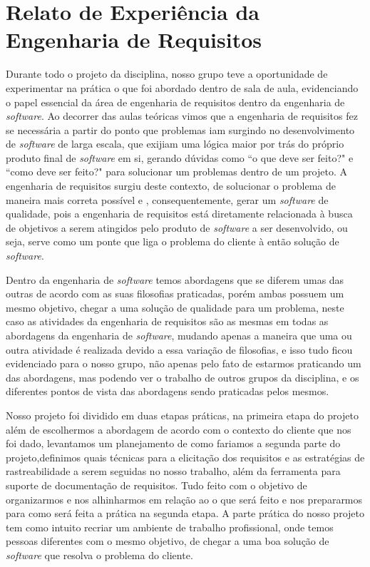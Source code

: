 \chapter{Relato de Experiência da Engenharia de Requisitos}

Durante todo o projeto da disciplina, nosso grupo teve a oportunidade de experimentar na prática o que foi abordado dentro de sala de aula, evidenciando o papel essencial da área de engenharia de requisitos dentro da engenharia de \textit{software}. Ao decorrer das aulas teóricas vimos que a engenharia de requisitos fez se necessária a partir do ponto que problemas iam surgindo no desenvolvimento de \textit{software} de larga escala, que exijiam uma lógica maior por trás do próprio produto final de \textit{software} em si, gerando dúvidas como ``o que deve ser feito?" e ``como deve ser feito?" para solucionar um problemas dentro de um projeto. A engenharia de requisitos surgiu deste contexto, de solucionar o problema de maneira mais correta possível e , consequentemente, gerar um \textit{software} de qualidade, pois a engenharia de requisitos está diretamente relacionada à busca de objetivos a serem atingidos pelo produto de \textit{software} a ser desenvolvido, ou seja, serve como um ponte que liga o problema do cliente à então solução de \textit{software}.

Dentro da engenharia de \textit{software} temos abordagens que se diferem umas das outras de acordo com as suas filosofias praticadas, porém ambas possuem um mesmo objetivo, chegar a uma solução de qualidade para um problema, neste caso as atividades da engenharia de requisitos são as mesmas em todas as abordagens da engenharia de \textit{software}, mudando apenas a maneira que uma ou outra atividade é realizada devido a essa variação de filosofias, e isso tudo ficou evidenciado para o nosso grupo, não apenas pelo fato de estarmos praticando um das abordagens, mas podendo ver o trabalho de outros grupos da disciplina, e os diferentes pontos de vista das abordagens sendo praticadas pelos mesmos.

Nosso projeto foi dividido em duas etapas práticas, na primeira etapa do projeto além de escolhermos a abordagem de acordo com o contexto do cliente que nos foi dado, levantamos um planejamento de como fariamos a segunda parte do projeto,definimos quais técnicas para a elicitação dos requisitos e as estratégias de rastreabilidade a serem seguidas no nosso trabalho, além da ferramenta para suporte de documentação de requisitos. Tudo feito com o objetivo de organizarmos e nos alhinharmos em relação ao o que será feito e nos prepararmos para como será feita a prática na segunda etapa. A parte prática do nosso projeto tem como intuito recriar um ambiente de trabalho profissional, onde temos pessoas diferentes com o mesmo objetivo, de chegar a uma boa solução de \textit{software} que resolva o problema do cliente.

